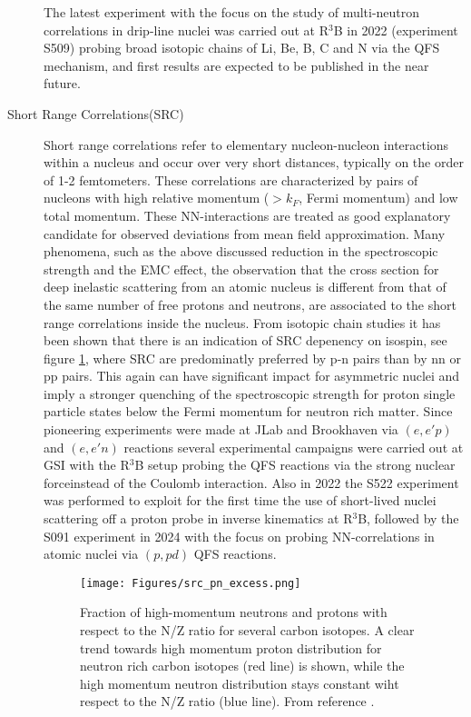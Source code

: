 \begin{description}
The latest experiment with the focus on the study of multi-neutron correlations in drip-line nuclei was carried out at R$^3$B in 2022 (experiment S509) probing broad isotopic chains of Li, Be, B, C and N via the QFS mechanism, and first results are expected to be published in the near future.
\item[Short Range Correlations(SRC)]Short range correlations refer to elementary nucleon-nucleon interactions within a nucleus and occur over very short distances, typically on the order of 1-2 femtometers.  These correlations are characterized by pairs of nucleons with high relative momentum ($> k_F$, Fermi momentum) and low total momentum. These NN-interactions are treated as good explanatory candidate for observed deviations from mean field approximation. Many phenomena, such as the above discussed reduction in the spectroscopic strength and the EMC effect\cite{xing2023electromagnetic}, the observation that  the cross section for deep inelastic scattering from an atomic nucleus is different from that of the same number of free protons and neutrons, are associated to the short range correlations inside the nucleus.\newline
From isotopic chain studies\cite{clas2018probing} it has been shown that there is an indication of SRC depenency on isospin, see figure \ref{fig:src_pairs}, where SRC are predominatly preferred by p-n pairs than by nn or pp pairs. This again can have significant impact for asymmetric nuclei and imply a stronger quenching of the spectroscopic strength for proton single particle states below the Fermi momentum for neutron rich matter.\newline  
Since pioneering experiments were made at JLab and Brookhaven via $(e,e'p)$ and $(e,e'n)$ reactions several  experimental campaigns were carried out at GSI with the R$^3$B setup probing the QFS reactions via the strong nuclear forceinstead of the Coulomb interaction. Also in 2022 the S522 experiment was performed to exploit for the first time the use of short-lived nuclei scattering off a proton probe in inverse kinematics at R$^3$B, followed by the S091 experiment in 2024 with the focus on probing NN-correlations in atomic nuclei via $(p,pd)$ QFS reactions\cite{paschalis2020nucleon}. 
\begin{figure}[htpb]
    \centering
    \texttt{[image: Figures/src\_pn\_excess.png]}
    \caption{
   	Fraction of high-momentum neutrons and protons with respect to the N/Z ratio for several carbon isotopes. A clear trend towards high momentum proton distribution for neutron rich carbon isotopes (red line) is shown, while the high momentum neutron distribution stays constant wiht respect to the N/Z ratio (blue line). From reference \cite{clas2018probing}. 
    }
    \label{fig:src_pairs}
\end{figure}



\end{description}
